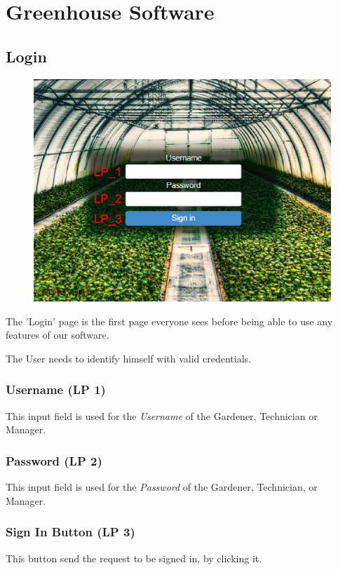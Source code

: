 \chapter{Greenhouse Software}
\label{chap:appendix_AllUser}


\section{Login}
\label{sec:appendix_SignIn}
\begin{figure}
\includegraphics[width=1\textwidth]{images/appendix_images/SignIn.eps}
\end{figure}

The 'Login' page is the first page everyone sees before being able to use any
features of our software.

The User needs to identify himself with valid credentials.

\subsection{Username (LP 1)}
This input field is used for the \emph{Username} of the Gardener, Technician or
Manager.

\subsection{Password (LP 2)}
This input field is used for the \emph{Password} of the Gardener, Technician, or
Manager.

\subsection{Sign In Button (LP 3)}
This button send the request to be signed in, by clicking it.

